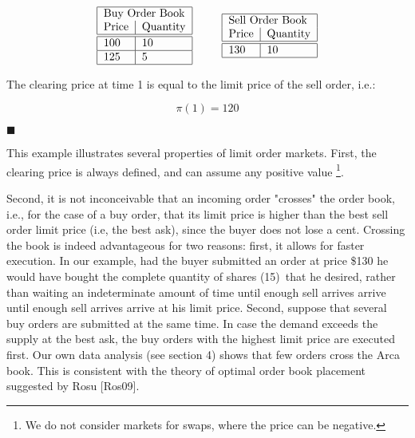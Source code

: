 \documentclass{article}
\begin{document}
\begin{equation*}
\begin{tabular}{|l|l|}
\hline
\multicolumn{2}{|l|}{Buy Order Book} \\ 
Price & Quantity \\ \hline\hline
100 & 10 \\ \hline
125 & 5 \\ \hline
\end{tabular}%
\text{ \ \ \ \ \ }%
\begin{tabular}{|l|l|}
\hline
\multicolumn{2}{|l|}{Sell Order Book} \\ 
Price & Quantity \\ \hline\hline
130 & 10 \\ \hline
\end{tabular}%
\end{equation*}

The clearing price at time 1 is equal to the limit price of the sell order,
i.e.:

\begin{equation*}
\pi (1)=120
\end{equation*}

$\blacksquare $

This example illustrates several properties of limit order markets. First,
the clearing price is always defined, and can assume any positive value%
\footnote{%
We do not consider markets for swaps, where the price can be negative.}.

Second, it is not inconceivable that an incoming order "crosses" the order
book, i.e., for the case of a buy order, that its limit price is higher than
the best sell order limit price (i.e, the best ask), since the buyer does
not lose a cent. Crossing the book is indeed advantageous for two reasons:
first, it allows for faster execution. In our example, had the buyer
submitted an order at price \$130 he would have bought the complete quantity
of shares (15)\ that he desired, rather than waiting an indeterminate amount
of time until enough sell arrives arrive until enough sell arrives arrive at
his limit price. Second, suppose that several buy orders are submitted at
the same time. In case the demand exceeds the supply at the best ask, the
buy orders with the highest limit price are executed first. Our own data
analysis (see section 4) shows that few orders cross the Arca book. This is
consistent with the theory of optimal order book placement suggested by Rosu
[Ros09].

\bigskip
\end{document}
